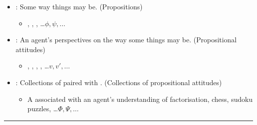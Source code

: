 \documentclass[10pt]{article}
\newcommand{\squareBullet}{\textcolor{black}{\raisebox{.45ex}{\rule{.6ex}{.6ex}}}}
\newcommand\lLine{{\color{gray} \noindent\rule{\textwidth}{0.4pt}}}
\begin{document}
\begin{note}
  \begin{itemize}[label = \squareBullet]
  \item
    \textbf{}: Some way things may be. \hfill {\color{gray} (Propositions)}
    \begin{itemize}
    \item
      , , , \dots \hfill \(\phi, \psi, \dots\)
    \end{itemize}
  \item
    \textbf{}: An agent's perspectives on the way some things may be. \hfill {\color{gray} (Propositional attitudes)}
    \begin{itemize}
    \item
      , , , , \dots \hfill \(v, v', \dots\)
    \end{itemize}
  \item
    \textbf{}: Collections of  paired with . \hfill {\color{gray} (Collections of propositional attitudes)}
    \begin{itemize}
    \item
      A \pool{} associated with an agent's understanding of factorisation, chess, sudoku puzzles, \dots \hfill \(\Phi, \Psi, \dots\)
    \end{itemize}
  \end{itemize}

\begin{comment}
  Think of this as a more flexible approach to propositional attitudes.
  Instead of agent evaluates \prop{} \(\phi\) to have \val{} \(v\), say agent formed attitude \(A\) toward proposition \(\phi\).

  \prop{3} correspond to propositions and \val{1} correspond to attitudes.
\end{comment}

  \lLine


\end{note}
\end{document}
